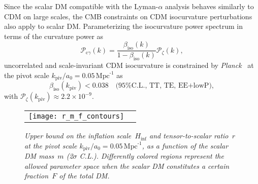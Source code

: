\documentclass[11pt,nofootinbib]{article}
\numberwithin{equation}{section}
\begin{document}
Since the scalar DM compatible with the Lyman-$\alpha$ analysis 
behaves similarly to CDM on large scales,
the CMB constraints on CDM isocurvature perturbations also apply to scalar DM.
Parameterizing the isocurvature power spectrum in terms of the curvature
power as
\begin{equation}
 \mathcal{P}_{\mathrm{c} \gamma} (k)
  = \frac{\beta_{\mathrm{iso}} (k)}{1 - \beta_{\mathrm{iso}} (k)}
  \mathcal{P}_\zeta (k),
\end{equation}
uncorrelated and scale-invariant CDM isocurvature
is constrained by {\it Planck}~\cite{Ade:2015lrj} 
at the pivot scale $k_{\mathrm{piv}} / a_0 = 0.05 \, \mathrm{Mpc}^{\text{-}1} $ as
\begin{equation}
 \beta_{\mathrm{iso}} (k_{\mathrm{piv}}) < 0.038 \quad
  \text{(95\% C.L., TT, TE, EE+lowP)},  
\end{equation}
with $\mathcal{P}_\zeta (k_{\mathrm{piv}}) \approx 2.2 \times
10^{-9}$. 


\begin{figure}[t]
  \begin{center}
  \begin{tabular}{lr}
  \texttt{[image: r\_m\_f\_contours]}
  \end{tabular}
   \caption{\emph{Upper bound on the inflation scale~$H_{\mathrm{inf}}$ and
   tensor-to-scalar ratio~$r$ at the pivot scale $k_{\mathrm{piv}} / a_0
   = 0.05 \, \mathrm{Mpc}^{\text{-}1} $, 
   as a function of the scalar DM mass~$m$ (2$\sigma$ C.L.). 
   Differently colored regions represent the allowed parameter space
   when the scalar DM constitutes a certain fraction~$F$ of the total DM.}}
  \label{fig:m-r}
  \end{center}
\end{figure}
\end{document}
